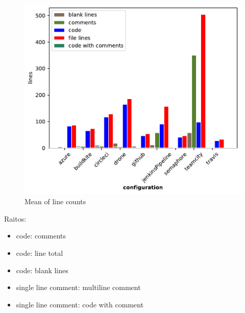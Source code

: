 \documentclass[twoside,12pt,titlepage,a4paper]{article}
\begin{document}
\begin{figure}[!ht]
  \centering
  \includegraphics[width=\textwidth]{../src/results/basic comments bars.pdf}
  \caption[alt text]{Mean of line counts}
  \label{fig:bar_comments_lines}
\end{figure}

Raitos:
\begin{itemize}
  \item{code: comments}
  \item{code: line total}
  \item{code: blank lines}
  \item{single line comment: multiline comment}
  \item{single line comment: code with comment}
\end{itemize}
\end{document}
